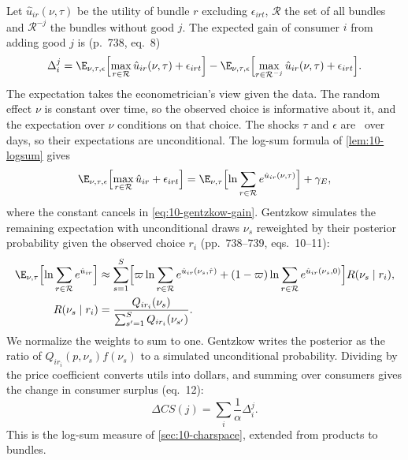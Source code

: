  Let $\hat u_{ir}(\nu, \tau)$ be the utility of bundle $r$ excluding $\epsilon_{irt}$, $\mathcal{R}$
the set of all bundles and $\mathcal{R}^{-j}$ the bundles without good $j$. The expected gain of consumer $i$ from
adding good $j$ is (p.~738, eq.~8)
\begin{equation}\label{eq:10-gentzkow-gain}
  \Delta_i^j = \E_{\nu,\tau,\epsilon}\Bigl[\max_{r\in\mathcal{R}}\hat u_{ir}(\nu, \tau) + \epsilon_{irt}\Bigr]
             - \E_{\nu,\tau,\epsilon}\Bigl[\max_{r\in\mathcal{R}^{-j}}\hat u_{ir}(\nu, \tau) + \epsilon_{irt}\Bigr] .
\end{equation}
The expectation takes the econometrician's view given the data. The random effect $\nu$ is constant over time, so the
observed choice is informative about it, and the expectation over $\nu$ conditions on that choice. The shocks $\tau$ and
$\epsilon$ are \iid\ over days, so their expectations are unconditional. The log-sum formula of
\cref{lem:10-logsum} gives
\begin{equation}\label{eq:10-gentzkow-logsum}
  \E_{\nu,\tau,\epsilon}\Bigl[\max_{r\in\mathcal{R}}\hat u_{ir} + \epsilon_{irt}\Bigr]
  = \E_{\nu,\tau}\Bigl[\ln\sum_{r\in\mathcal{R}}e^{\hat u_{ir}(\nu,\tau)}\Bigr] + \gamma_E ,
\end{equation}
where the constant cancels in \eqref{eq:10-gentzkow-gain}. Gentzkow simulates the remaining expectation with
unconditional draws $\nu_s$ reweighted by their posterior probability given the observed choice $r_i$ (pp.~738--739,
eqs.~10--11):
\begin{equation}\label{eq:10-gentzkow-sim}
\begin{aligned}
  \E_{\nu,\tau}\Bigl[\ln\sum_{r\in\mathcal{R}}e^{\hat u_{ir}}\Bigr] &\approx \sum_{s=1}^{S}\Bigl[\varpi\ln
  \sum_{r\in\mathcal{R}}e^{\hat u_{ir}(\nu_s,\hat\tau)} + (1 - \varpi)\ln\sum_{r\in\mathcal{R}}e^{\hat u_{ir}(\nu_s, 0)}\Bigr]
  R(\nu_s \mid r_i), \\
  R(\nu_s\mid r_i) &= \frac{Q_{ir_i}(\nu_s)}{\sum_{s'=1}^{S}Q_{ir_i}(\nu_{s'})} .
\end{aligned}
\end{equation}
We normalize the weights to sum to one. Gentzkow writes the posterior as the ratio of $Q_{ir_i}(p, \nu_s)f(\nu_s)$ to a
simulated unconditional probability. Dividing by the price coefficient converts utils into dollars, and summing over
consumers gives the change in consumer surplus (eq.~12):
\begin{equation}\label{eq:10-gentzkow-cs}
  \Delta CS(j) = \sum_i\frac{1}{\alpha}\Delta_i^j .
\end{equation}
This is the log-sum measure of \cref{sec:10-charspace}, extended from products to bundles.

